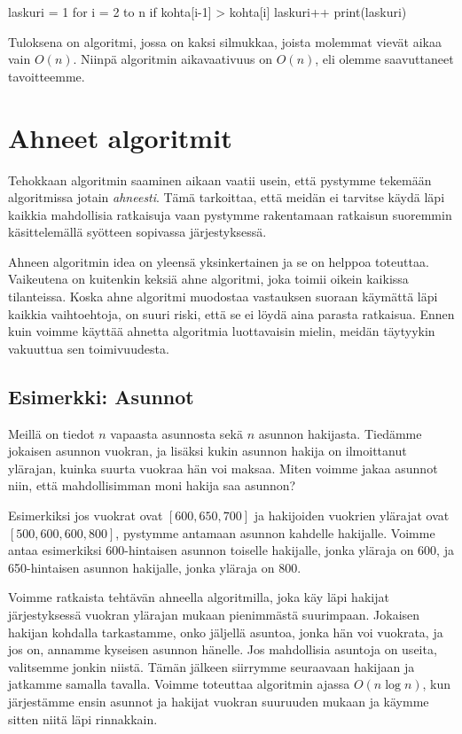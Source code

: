 \begin{code}
laskuri = 1
for i = 2 to n
    if kohta[i-1] > kohta[i]
        laskuri++
print(laskuri)
\end{code}

Tuloksena on algoritmi, jossa on kaksi silmukkaa,
joista molemmat vievät aikaa vain $O(n)$.
Niinpä algoritmin aikavaativuus on $O(n)$,
eli olemme saavuttaneet tavoitteemme.

\section{Ahneet algoritmit}

Tehokkaan algoritmin saaminen aikaan vaatii usein,
että pystymme tekemään algoritmissa jotain \emph{ahneesti}.
Tämä tarkoittaa, että meidän ei tarvitse käydä läpi
kaikkia mahdollisia ratkaisuja vaan pystymme rakentamaan
ratkaisun suoremmin käsittelemällä syötteen sopivassa järjestyksessä.

Ahneen algoritmin idea on yleensä yksinkertainen ja
se on helppoa toteuttaa.
Vaikeutena on kuitenkin keksiä ahne algoritmi,
joka toimii oikein kaikissa tilanteissa.
Koska ahne algoritmi muodostaa vastauksen suoraan
käymättä läpi kaikkia vaihtoehtoja, on suuri riski,
että se ei löydä aina parasta ratkaisua.
Ennen kuin voimme käyttää ahnetta algoritmia luottavaisin mielin,
meidän täytyykin vakuuttua sen toimivuudesta.

\subsection{Esimerkki: Asunnot}

Meillä on tiedot $n$ vapaasta asunnosta sekä
$n$ asunnon hakijasta.
Tiedämme jokaisen asunnon vuokran,
ja lisäksi kukin asunnon hakija on ilmoittanut
ylärajan, kuinka suurta vuok\-raa hän voi maksaa.
Miten voimme jakaa asunnot niin,
että mahdollisimman moni hakija saa asunnon?

Esimerkiksi jos vuokrat ovat $[600,650,700]$ ja
hakijoiden vuokrien ylärajat ovat $[500,600,600,800]$,
pystymme antamaan asunnon kahdelle hakijalle.
Voimme antaa esimerkiksi 600-hintaisen asunnon
toiselle hakijalle, jonka yläraja on 600,
ja 650-hintaisen asunnon hakijalle, jonka yläraja on 800.

Voimme ratkaista tehtävän ahneella algoritmilla,
joka käy läpi hakijat järjestyksessä vuokran
ylärajan mukaan pienimmästä suurimpaan.
Jokaisen hakijan kohdalla tarkastamme,
onko jäljellä asuntoa, jonka hän voi vuokrata,
ja jos on, annamme kyseisen asunnon hänelle.
Jos mahdollisia asuntoja on useita,
valitsemme jonkin niistä.
Tämän jälkeen siirrymme seuraavaan hakijaan
ja jatkamme samalla tavalla.
Voimme toteuttaa algoritmin ajassa $O(n \log n)$,
kun järjestämme ensin asunnot ja hakijat
vuokran suuruuden mukaan ja käymme sitten niitä
läpi rinnakkain.

